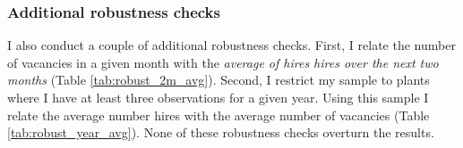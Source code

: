 \subsubsection{Additional robustness checks}

I also conduct a couple of additional robustness checks. First,  I relate the number of vacancies in a given month with the \emph{average of hires hires over the next two months} (Table \ref{tab:robust_2m_avg}). Second, I restrict my sample to plants where I have at least three observations for a given year. Using this sample I relate the average number hires with the average number of vacancies (Table  \ref{tab:robust_year_avg}). None of these robustness checks overturn the results.